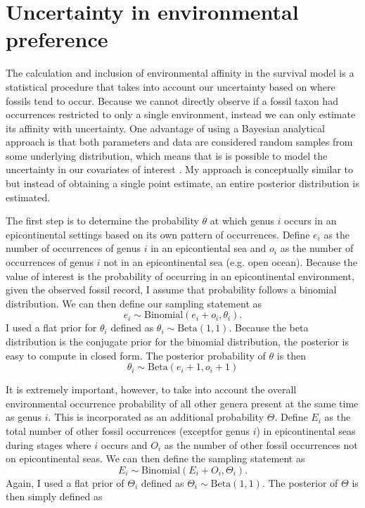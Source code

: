 \documentclass[12pt,letterpaper]{article}
\begin{document}
\section{Uncertainty in environmental preference} \label{sec:uncer}
The calculation and inclusion of environmental affinity in the survival model is a statistical procedure that takes into account our uncertainty based on where fossils tend to occur. Because we cannot directly observe if a fossil taxon had occurrences restricted to only a single environment, instead we can only estimate its affinity with uncertainty. One advantage of using a Bayesian analytical approach is that both parameters and data are considered random samples from some underlying distribution, which means that is is possible to model the uncertainty in our covariates of interest \citep{Gelman2013d}. My approach is conceptually similar to \citet{Simpson2009} but instead of obtaining a single point estimate, an entire posterior distribution is estimated.

The first step is to determine the probability \(\theta\) at which genus \(i\) occurs in an epicontinental settings based on its own pattern of occurrences. Define \(e_{i}\) as the number of occurrences of genus \(i\) in an epicontiental sea and \(o_{i}\) as the number of occurrences of genus \(i\) not in an epicontinental sea (e.g. open ocean). Because the value of interest is the probability of occurring in an epicontinental environment, given the observed fossil record, I assume that probability follows a binomial distribution. We can then define our sampling statement as
\begin{equation}
  e_{i} \sim \mathrm{Binomial}(e_{i} + o_{i}, \theta_{i}).
  \label{eq:epi_lik}
\end{equation}
I used a flat prior for \(\theta_{i}\) defined as \(\theta_{i} \sim \mathrm{Beta}(1, 1)\). Because the beta distribution is the conjugate prior for the binomial distribution, the posterior is easy to compute in closed form. The posterior probability of \(\theta\) is then 
\begin{equation}
  \theta_{i} \sim \mathrm{Beta}(e_{i} + 1, o_{i} + 1)
  \label{eq:epi_post}
\end{equation}

It is extremely important, however, to take into account the overall environmental occurrence probability of all other genera present at the same time as genus \(i\). This is incorporated as an additional probability \(\Theta\). Define \(E_{i}\) as the total number of other fossil occurrences (exceptfor genus \(i\)) in epicontinental seas during stages where \(i\) occurs and \(O_{i}\) as the number of other fossil occurrences not on epicontinental seas. We can then define the sampling statement as
\begin{equation}
  E_{i} \sim \mathrm{Binomial}(E_{i} + O_{i}, \Theta_{i}).
  \label{eq:bck_lik}
\end{equation}
Again, I used a flat prior of \(\Theta_{i}\) defined as \(\Theta_{i} \sim \mathrm{Beta}(1, 1)\). The posterior of \(\Theta\) is then simply defined as
\end{document}
